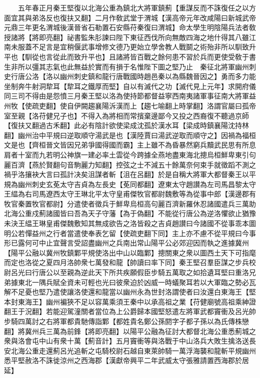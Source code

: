 　　五年春正月秦王堅復以北海公重為鎮北大將軍鎮薊【重謀反而不誅復任之以方面宜其與弟洛反也復扶又翻】二月作敎武堂于渭城【漢高帝元年改咸陽曰新城武帝元鼎三年更名渭城後漢晉省石勒置石安縣苻秦復曰渭城】命太學生明陰陽兵法者敎授諸將【將即亮翻】祕書監朱肜諫曰陛下東征西伐所向無敵四海之地什得其八雖江南未服蓋不足言是宜稍偃武事增修文德乃更始立學舍教人戰鬬之術殆非所以馴致升平也【馴從也言從此而致升平也】且諸將皆百戰之餘何患不習於兵而更使受敎于書生非所以彊其志氣也此無益於實而有損于名惟陛下圖之堅乃止　秦征北將軍幽州刺史行唐公洛【洛以幽州刺史鎮和龍行唐戰國時趙邑秦以為縣魏晉因之】勇而多力能坐制奔牛射洞犂耳【犂耳之鐵厚而堅】自以有滅代之功【滅代見上元年】求開府儀同三司不得由是怨憤三月秦王堅以洛為使持節都督益寧西南夷諸軍事征南大將軍益州牧【使疏吏翻】使自伊闕趨襄陽泝漢而上【趨七喻翻上時掌翻】洛謂官屬曰孤帝室至親【洛苻健兄子也】不得入為將相而常擯棄邊鄙今又投之西裔復不聽過京師【復扶又翻過古禾翻】此必有陰計欲使梁成沈孤於漢水耳【梁成時鎮襄陽沈持林翻】幽州治中平規曰逆取順守湯武是也【漢陸賈曰湯武逆取而順守之】因禍為福桓文是也【齊桓晉文皆因兄弟爭國得國而霸】主上雖不為昏暴然窮兵黷武民思有所息肩者十室而九若明公神旗一建必率土雲從今跨據全燕地盡東海北摠烏桓鮮卑東引句麗百濟【燕於賢翻句音駒麗力知翻】控弦之士不減五十餘萬奈何束手就徵蹈不測之禍乎洛攘袂大言曰孤計决矣沮謀者斬【沮在呂翻】於是自稱大將軍大都督秦王以平規為幽州刺史玄莬太守吉貞為左長史【莬同都翻】遼東太守趙讃為左司馬昌黎太守王緼為右司馬遼西太守王琳北平太守皇甫傑牧官都尉魏敷等為從事中郎【漢邊郡有牧官秦置牧官都尉】分遣使者徵兵于鮮卑烏桓高句麗百濟新羅休忍諸國遣兵三萬助北海公重戍薊諸國皆曰吾為天子守藩【為于偽翻】不能從行唐公為逆洛懼欲止猶豫未決王緼王琳皇甫傑魏敷知其無成欲告之洛皆殺之吉貞趙讃曰今諸國不從事乖本圖明公若憚益州之行者當遣使奉表乞留【使疏吏翻下同】主上亦不慮不從平規曰今事形已露何可中止宜聲言受詔盡幽州之兵南出常山陽平公必郊迎因而執之進據冀州【陽平公融以冀州牧鎮鄴平規使洛出中山以臨鄴】摠關東之衆以圖西土天下可指麾而定也洛從之夏四月洛帥衆七萬發和龍【帥讀曰率下同】秦王堅召羣臣謀之步兵校尉呂光曰行唐公以至親為逆此天下所共疾願假臣步騎五萬取之如拾遺耳堅曰重洛兄弟據東北一隅兵賦全資未可輕也光曰彼衆迫於凶威一時蟻聚耳若以大軍臨之勢必瓦解不足憂也堅乃遣使讓洛使還和龍當以幽州永為世封洛謂使者曰汝還白東海王【堅本封東海王】幽州褊狹不足以容萬乘須王秦中以承高祖之業【苻健廟號高祖乘紳證翻王于況翻】若能迎駕潼關者當位為上公爵歸本國堅怒遣左將軍武都竇衝及呂光帥步騎四萬討之右將軍都貴馳傳詣鄴【都姓貴名鄭公孫閼字子都子孫以為氏傳株戀翻】將冀州兵三萬為前鋒【將即亮翻】以陽平公融為征討大都督北海公重悉薊城之衆與洛會屯中山有衆十萬【薊音計】五月竇衝等與洛戰于中山洛兵大敗生擒洛送長安北海公重走還薊呂光追斬之屯騎校尉石越自東萊帥騎一萬浮海襲和龍斬平規幽州悉平堅赦洛不誅徙涼州之西海郡【漢獻帝興平二年武威太守張雅請置西海郡於居延】

